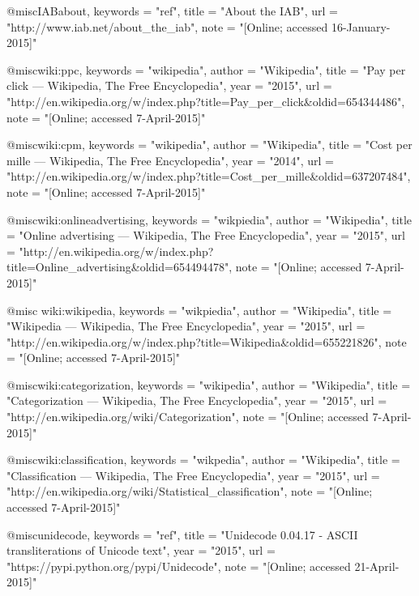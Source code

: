 @misc{IABabout,
    keywords    =   "ref",
    title       =   "About the {IAB}",
    url         =   "http://www.iab.net/about_the_iab",
    note        =   "[Online; accessed 16-January-2015]" 
}

@misc{wiki:ppc,
    keywords    =   "wikipedia",
    author      =   "Wikipedia",
    title       =   "Pay per click --- Wikipedia{,} The Free Encyclopedia",
    year        =   "2015",
    url         =   "http://en.wikipedia.org/w/index.php?title=Pay_per_click&oldid=654344486",
    note        =   "[Online; accessed 7-April-2015]"
}
 
@misc{wiki:cpm,
    keywords    =   "wikipedia",
    author      =   "Wikipedia",
    title       =   "Cost per mille --- Wikipedia{,} The Free Encyclopedia",
    year        =   "2014",
    url         =   "http://en.wikipedia.org/w/index.php?title=Cost_per_mille&oldid=637207484",
    note        =   "[Online; accessed 7-April-2015]"
}
 
@misc{wiki:onlineadvertising,
    keywords    =   "wikpiedia",
    author      =   "Wikipedia",
    title       =   "Online advertising --- Wikipedia{,} The Free Encyclopedia",
    year        =   "2015",
    url         =   "http://en.wikipedia.org/w/index.php?title=Online_advertising&oldid=654494478",
    note        =   "[Online; accessed 7-April-2015]"
}
 
@misc{ wiki:wikipedia,
    keywords    =   "wikpiedia",
    author      =   "Wikipedia",
    title       =   "Wikipedia --- Wikipedia{,} The Free Encyclopedia",
    year        =   "2015",
    url         =   "http://en.wikipedia.org/w/index.php?title=Wikipedia&oldid=655221826",
    note        =   "[Online; accessed 7-April-2015]"
}
 
@misc{wiki:categorization,
    keywords    =   "wikipedia",
    author      =   "Wikipedia",
    title       =   "Categorization --- Wikipedia{,} The Free Encyclopedia",
    year        =   "2015",
    url         =   "http://en.wikipedia.org/wiki/Categorization",
    note        =   "[Online; accessed 7-April-2015]"
}
 

@misc{wiki:classification,
    keywords    =   "wikpedia",
    author      =   "Wikipedia",
    title       =   "Classification --- Wikipedia{,} The Free Encyclopedia",
    year        =   "2015",
    url         =   "http://en.wikipedia.org/wiki/Statistical_classification",
    note        =   "[Online; accessed 7-April-2015]"
}
 
@misc{unidecode,
    keywords    =   "ref",
    title       =   "Unidecode 0.04.17 - ASCII transliterations of Unicode text",
    year        =   "2015",
    url         =   "https://pypi.python.org/pypi/Unidecode",
    note        =   "[Online; accessed 21-April-2015]"
}
 
